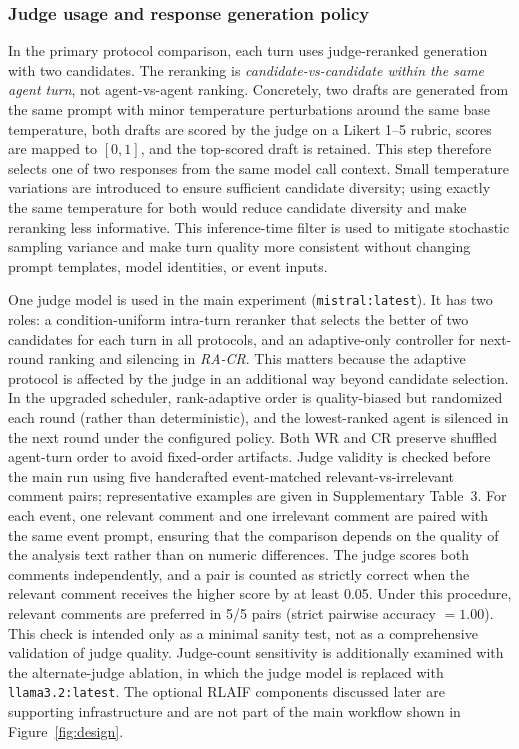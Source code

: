 \documentclass[11pt]{article}
\begin{document}
\subsubsection*{Judge usage and response generation policy}
In the primary protocol comparison, each turn uses judge-reranked generation with two candidates. The reranking is \emph{candidate-vs-candidate within the same agent turn}, not agent-vs-agent ranking. Concretely, two drafts are generated from the same prompt with minor temperature perturbations around the same base temperature, both drafts are scored by the judge on a Likert 1--5 rubric, scores are mapped to $[0,1]$, and the top-scored draft is retained. This step therefore selects one of two responses from the same model call context. Small temperature variations are introduced to ensure sufficient candidate diversity; using exactly the same temperature for both would reduce candidate diversity and make reranking less informative. This inference-time filter is used to mitigate stochastic sampling variance and make turn quality more consistent without changing prompt templates, model identities, or event inputs.

One judge model is used in the main experiment (\texttt{mistral:latest}). It has two roles: a condition-uniform intra-turn reranker that selects the better of two candidates for each turn in all protocols, and an adaptive-only controller for next-round ranking and silencing in \emph{RA-CR}. This matters because the adaptive protocol is affected by the judge in an additional way beyond candidate selection. In the upgraded scheduler, rank-adaptive order is quality-biased but randomized each round (rather than deterministic), and the lowest-ranked agent is silenced in the next round under the configured policy. Both WR and CR preserve shuffled agent-turn order to avoid fixed-order artifacts. Judge validity is checked before the main run using five handcrafted event-matched relevant-vs-irrelevant comment pairs; representative examples are given in Supplementary Table~3. For each event, one relevant comment and one irrelevant comment are paired with the same event prompt, ensuring that the comparison depends on the quality of the analysis text rather than on numeric differences. The judge scores both comments independently, and a pair is counted as strictly correct when the relevant comment receives the higher score by at least 0.05. Under this procedure, relevant comments are preferred in 5/5 pairs (strict pairwise accuracy $=1.00$). This check is intended only as a minimal sanity test, not as a comprehensive validation of judge quality. Judge-count sensitivity is additionally examined with the alternate-judge ablation, in which the judge model is replaced with \texttt{llama3.2:latest}. The optional RLAIF components discussed later are supporting infrastructure and are not part of the main workflow shown in Figure~\ref{fig:design}.
\end{document}
